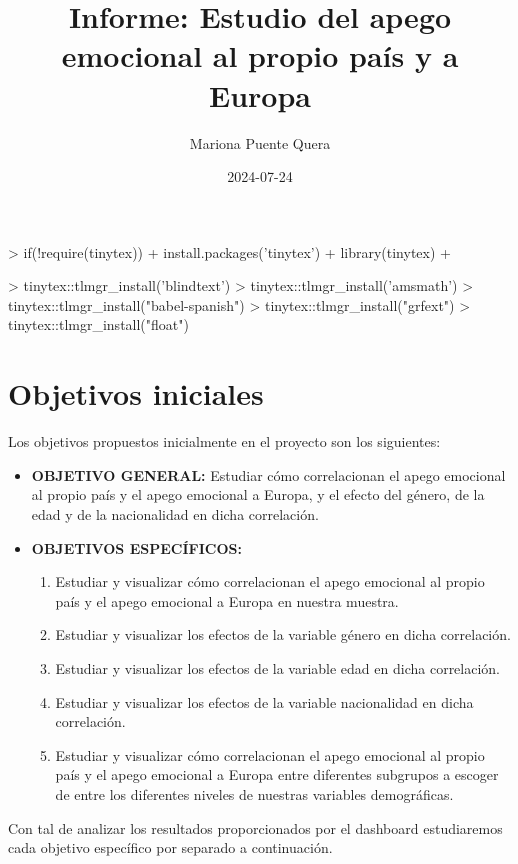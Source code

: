 \documentclass{article}
\title{Informe: Estudio del apego emocional al propio país y a Europa}
\author{Mariona Puente Quera}
\date{2024-07-24}
\begin{document}
\maketitle



\begin{Schunk}
\begin{Sinput}
> if(!require(tinytex)){
+   install.packages('tinytex')
+   library(tinytex)
+ }
\end{Sinput}
\end{Schunk}

\begin{Schunk}
\begin{Sinput}
> tinytex::tlmgr_install('blindtext')
> tinytex::tlmgr_install('amsmath')
> tinytex::tlmgr_install("babel-spanish")
> tinytex::tlmgr_install("grfext")
> tinytex::tlmgr_install("float")
\end{Sinput}
\end{Schunk}

\section*{Objetivos iniciales}
Los objetivos propuestos inicialmente en el proyecto son los siguientes:

\begin{itemize}
    \item \textbf{OBJETIVO GENERAL:} Estudiar cómo correlacionan el apego emocional al propio país y el apego emocional a Europa, y el efecto del género, de la edad y de la nacionalidad en dicha correlación.
    \item \textbf{OBJETIVOS ESPECÍFICOS:}
    \begin{enumerate}
        \item Estudiar y visualizar cómo correlacionan el apego emocional al propio país y el apego emocional a Europa en nuestra muestra.
        \item Estudiar y visualizar los efectos de la variable género en dicha correlación.
        \item Estudiar y visualizar los efectos de la variable edad en dicha correlación.
        \item Estudiar y visualizar los efectos de la variable nacionalidad en dicha correlación.
        \item Estudiar y visualizar cómo correlacionan el apego emocional al propio país y el apego emocional a Europa entre diferentes subgrupos a escoger de entre los diferentes niveles de nuestras variables demográficas.
    \end{enumerate}
\end{itemize}
Con tal de analizar los resultados proporcionados por el dashboard estudiaremos cada objetivo específico por separado a continuación.
\end{document}
